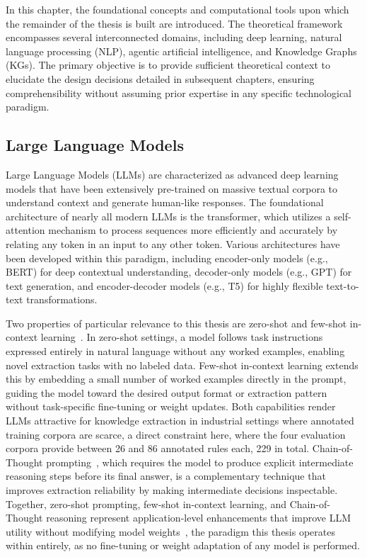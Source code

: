 \documentclass[11pt]{article}
\begin{document}
In this chapter, the foundational concepts and computational tools upon which the remainder of the thesis is built are introduced. The theoretical framework encompasses several interconnected domains, including deep learning, natural language processing (NLP), agentic artificial intelligence, and Knowledge Graphs (KGs). The primary objective is to provide sufficient theoretical context to elucidate the design decisions detailed in subsequent chapters, ensuring comprehensibility without assuming prior expertise in any specific technological paradigm.

\subsection{Large Language Models}
\label{sec:bg_llm}

Large Language Models (LLMs) are characterized as advanced deep learning models that have been extensively pre-trained on massive textual corpora to understand context and generate human-like responses. The foundational architecture of nearly all modern LLMs is the transformer, which utilizes a self-attention mechanism to process sequences more efficiently and accurately by relating any token in an input to any other token. Various architectures have been developed within this paradigm, including encoder-only models (e.g., BERT) for deep contextual understanding, decoder-only models (e.g., GPT) for text generation, and encoder-decoder models (e.g., T5) for highly flexible text-to-text transformations.

Two properties of particular relevance to this thesis are zero-shot and few-shot in-context learning~\cite{brown2020gpt3}. In zero-shot settings, a model follows task instructions expressed entirely in natural language without any worked examples, enabling novel extraction tasks with no labeled data. Few-shot in-context learning extends this by embedding a small number of worked examples directly in the prompt, guiding the model toward the desired output format or extraction pattern without task-specific fine-tuning or weight updates. Both capabilities render LLMs attractive for knowledge extraction in industrial settings where annotated training corpora are scarce, a direct constraint here, where the four evaluation corpora provide between 26 and 86 annotated rules each, 229 in total. Chain-of-Thought prompting~\cite{wei2022cot}, which requires the model to produce explicit intermediate reasoning steps before its final answer, is a complementary technique that improves extraction reliability by making intermediate decisions inspectable. Together, zero-shot prompting, few-shot in-context learning, and Chain-of-Thought reasoning represent application-level enhancements that improve LLM utility without modifying model weights~\cite{katanforoosh2025cs230}, the paradigm this thesis operates within entirely, as no fine-tuning or weight adaptation of any model is performed.
\end{document}
